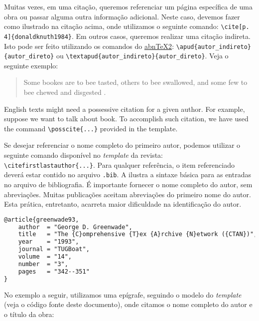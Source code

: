 \documentclass[portuguese]{textolivre}
\begin{document}
Muitas vezes, em uma citação, queremos referenciar um página específica de uma obra ou passar
alguma outra informação adicional.
Neste caso, devemos fazer como ilustrado na citação acima, onde utilizamos o seguinte comando: \verb|\cite[p. 4]{donaldknuth1984}|.
Em outros casos, queremos realizar uma citação indireta. Isto pode ser feito utilizando os
comandos do \href{https://github.com/abntex/abntex2}{abnTeX2}: \verb|\apud{autor_indireto}{autor_direto}| ou \verb|\textapud{autor_indireto}{autor_direto}|.
Veja o seguinte exemplo:
\begin{quote}
Some bookes are to bee tasted,
others to bee swallowed,
and some few to bee chewed and disgested .
\end{quote}

\begin{english}
English texts might need a possessive citation for a given author. For example,
suppose we want to talk about  book. To accomplish such citation, we have used the command \verb|\posscite{...}|
provided in the template.
\end{english}

Se desejar referenciar o nome completo do primeiro autor, podemos utilizar o seguinte comando disponível no \emph{template} da revista: \verb|\citefirstlastauthor{...}|.
Para qualquer referência, o item referenciado deverá estar contido no arquivo \texttt{.bib}. A  ilustra a sintaxe básica para
as entradas no arquivo de bibliografia. É importante fornecer o nome completo do autor, sem abreviações.
Muitas publicações aceitam abreviações do primeiro nome do autor. Esta prática, entretanto, acarreta maior
dificuldade na identificação do autor.

\begin{lstlisting}[language=tex, label=lst-bib, caption={Estrutura básica de uma entrada no arquivo de bibliografia.}, source={\LaTeX{} Wikibook (\protect\url{https://en.wikibooks.org/wiki/LaTeX/Bibliography_Management}).}]
@article{greenwade93,
    author  = "George D. Greenwade",
    title   = "The {C}omprehensive {T}ex {A}rchive {N}etwork ({CTAN})",
    year    = "1993",
    journal = "TUGBoat",
    volume  = "14",
    number  = "3",
    pages   = "342--351"
}
\end{lstlisting} %

No exemplo a seguir, utilizamos uma epígrafe, seguindo o modelo do \emph{template} (veja o código fonte deste documento), 
onde citamos o nome completo do autor e o título da obra:
\end{document}
